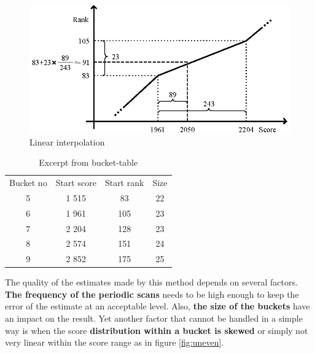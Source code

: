 \begin{figure}[h!]
  \centering
  \caption{Linear interpolation}
  \label{fig:linear}
  \includegraphics[width=13cm]{img/linear_interpolation.eps}
\end{figure}

\begin{table}[h]
  \begin{center}
  \begin{tabular}{ c c c c }
    Bucket no & Start score & Start rank & Size \\
    5 & 1 515 & 83 & 22 \\ 
    6 & 1 961 & 105 & 23 \\ 
    7 & 2 204 & 128 & 23 \\ 
    8 & 2 574 & 151 & 24 \\  
    9 & 2 852 & 175 & 25 \\ 
  \end{tabular} 
  \caption{Excerpt from bucket-table}
  \label{table:ranking-table}
  \end{center} 
\end{table}

The quality of the estimates made by this method depends on several factors.
\textbf{The frequency of the periodic scans} needs to be high enough to keep the error of the estimate at an acceptable level. Also, \textbf{the size of the buckets} have an impact on the result. Yet another factor that cannot be handled in a simple way is when the score \textbf{distribution within a bucket is skewed} or simply not very linear within the score range as in figure \ref{fig:uneven}.

